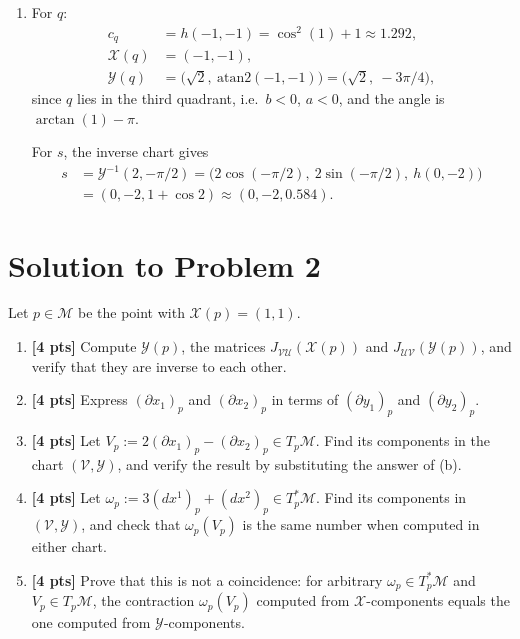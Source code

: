 \documentclass[11pt]{article}
\newcommand{\probTwo}{%
Let $p\in\mathcal M$ be the point with $\mathcal X(p)=(1,1)$.
\begin{enumerate}[label=(\alph*)]
\item \textbf{[4 pts]} Compute $\mathcal Y(p)$, the matrices $J_{\mathcal{VU}}(\mathcal X(p))$ and $J_{\mathcal{UV}}(\mathcal Y(p))$, and verify that
they are inverse to each other.
\item \textbf{[4 pts]} Express $(\partial x_1)_p$ and $(\partial x_2)_p$ in terms of $(\partial y_1)_p$ and $(\partial y_2)_p$.
\item \textbf{[4 pts]} Let $V_p:=2(\partial x_1)_p-(\partial x_2)_p\in T_p\mathcal M$. Find its components in the chart $(\mathcal V,\mathcal Y)$, and
verify the result by substituting the answer of (b).
\item \textbf{[4 pts]} Let $\omega_p:=3(dx^1)_p+(dx^2)_p\in T_p^*\mathcal M$. Find its components in $(\mathcal V,\mathcal Y)$, and check that
$\omega_p(V_p)$ is the same number when computed in either chart.
\item \textbf{[4 pts]} Prove that this is not a coincidence: for arbitrary $\omega_p\in T_p^*\mathcal M$ and $V_p\in T_p\mathcal M$, the
contraction $\omega_p(V_p)$ computed from $\mathcal X$-components equals the one computed from $\mathcal Y$-components.
\end{enumerate}}
\begin{document}
\begin{enumerate}[label=(\alph*)]
Two charts are $C^\infty$-compatible when both transition maps are $C^\infty$ on the images of the overlap; the atlas
$\{(\mathcal U,\mathcal X),(\mathcal V,\mathcal Y)\}$ is therefore $C^\infty$-compatible, and $\mathcal A\equiv\mathcal A_{C^\infty}$.
\item For $q$:
\begin{align*}
c_q&=h(-1,-1)=\cos^2(1)+1\approx1.292,\\
\mathcal X(q)&=(-1,-1),\\
\mathcal Y(q)&=\bigl(\sqrt2,\ \mathrm{atan2}(-1,-1)\bigr)=\bigl(\sqrt2,\ -3\pi/4\bigr),
\end{align*}
since $q$ lies in the third quadrant, i.e.\ $b<0$, $a<0$, and the angle is $\arctan(1)-\pi$.

For $s$, the inverse chart gives
\begin{align*}
s&=\mathcal Y^{-1}(2,-\pi/2)=\bigl(2\cos(-\pi/2),\ 2\sin(-\pi/2),\ h(0,-2)\bigr)\\
&=(0,-2,1+\cos2)\approx(0,-2,0.584).
\end{align*}
\end{enumerate}

\section*{Solution to Problem 2}
\probTwo
\end{document}
